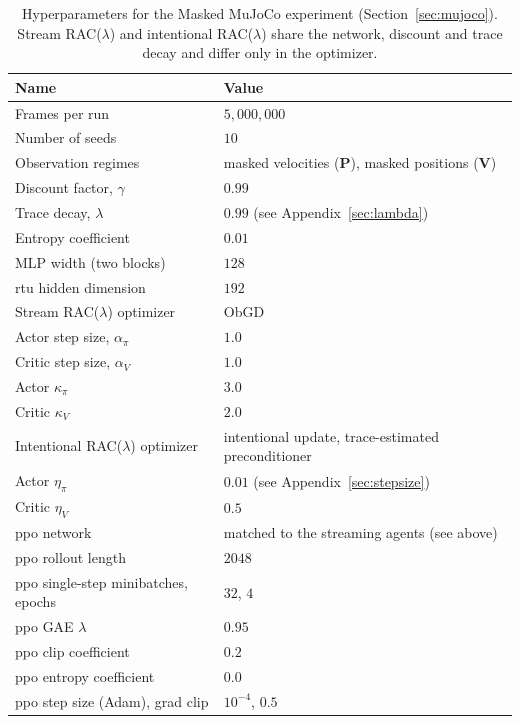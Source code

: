 \documentclass{article}
\begin{document}
\begin{table}[htbp]
\centering
\caption{Hyperparameters for the Masked MuJoCo experiment
(Section~\ref{sec:mujoco}). Stream RAC($\lambda$) and intentional RAC($\lambda$)
share the network, discount and trace decay and differ only in the optimizer.}
\label{tab:hparams-mujoco}
\begin{tabular}{ll}
\toprule
Name & Value \\
\midrule
Frames per run                         & $5{,}000{,}000$ \\
Number of seeds                        & $10$ \\
Observation regimes                    & masked velocities (\textbf{P}), masked positions (\textbf{V}) \\
Discount factor, $\gamma$              & $0.99$ \\
Trace decay, $\lambda$                 & $0.99$ (see Appendix~\ref{sec:lambda}) \\
Entropy coefficient                    & $0.01$ \\
MLP width (two blocks)                 & $128$ \\
\gls{rtu} hidden dimension             & $192$ \\
\midrule
Stream RAC($\lambda$) optimizer        & ObGD \\
Actor step size, $\alpha_\pi$          & $1.0$ \\
Critic step size, $\alpha_V$           & $1.0$ \\
Actor $\kappa_\pi$                     & $3.0$ \\
Critic $\kappa_V$                      & $2.0$ \\
\midrule
Intentional RAC($\lambda$) optimizer   & intentional update, trace-estimated preconditioner \\
Actor $\eta_\pi$                       & $0.01$ (see Appendix~\ref{sec:stepsize}) \\
Critic $\eta_V$                        & $0.5$ \\
\midrule
\gls{ppo} network                      & matched to the streaming agents (see above) \\
\gls{ppo} rollout length               & $2048$ \\
\gls{ppo} single-step minibatches, epochs & $32$, $4$ \\
\gls{ppo} GAE $\lambda$                & $0.95$ \\
\gls{ppo} clip coefficient             & $0.2$ \\
\gls{ppo} entropy coefficient          & $0.0$ \\
\gls{ppo} step size (Adam), grad clip  & $10^{-4}$, $0.5$ \\
\bottomrule
\end{tabular}
\end{table}
\end{document}
